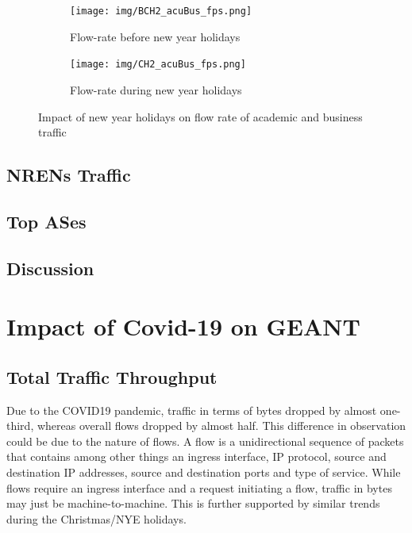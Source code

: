 \documentclass[10pt, journal, letterpaper]{IEEEtran}
\newcommand\linearFigSze{0.48}
\begin{document}
\begin{figure}
    \begin{subfigure}{\linearFigSze\textwidth}
          \centering
          \texttt{[image: img/BCH2\_acuBus\_fps.png]}
          \caption{Flow-rate before new year holidays}
          \label{fig:BCH2_acaBus_fps}
    \end{subfigure}
    \begin{subfigure}{\linearFigSze\textwidth}
          \centering
          \texttt{[image: img/CH2\_acuBus\_fps.png]}
          \caption{Flow-rate during new year holidays}
          \label{fig:CH2_acaBus_fps}
    \end{subfigure}
    \caption{Impact of new year holidays on flow rate of academic and business traffic}
    \label{fig:flowrate_acaBus_BCH_CH}
\end{figure}

\subsection{NRENs Traffic}

\subsection{Top ASes}

\subsection{Discussion}



\section{Impact of Covid-19 on GEANT}

\subsection{Total Traffic Throughput}
Due to the COVID19 pandemic, traffic in terms of bytes dropped by almost one-third, whereas overall flows dropped by almost half. This difference in observation could be due to the nature of flows. A flow is a unidirectional sequence of packets that contains among other things an ingress interface, IP protocol, source and destination IP addresses, source and destination ports and type of service. While flows require an ingress interface and a request initiating a flow, traffic in bytes may just be machine-to-machine. This is further supported by similar trends during the Christmas/NYE holidays.
\end{document}
